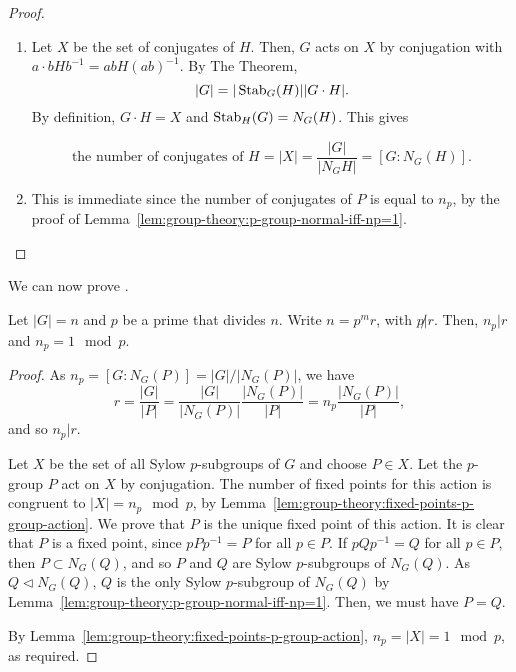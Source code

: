 \begin{proof}
  \begin{enumerate}
  \item Let \(X\) be the set of conjugates of \(H\). Then, \(G\) acts on \(X\) by conjugation with \(a \cdot bHb^{-1} = abH(ab)^{-1}\). By The  Theorem,
    \[|G| = |\operatorname{Stab}_{G}(H)| |G\cdot H|.\]
    By definition, \(G \cdot H = X\) and \(\operatorname{Stab}_{H}(G) = N_{G}(H)\). This gives

    \[\text{the number of conjugates of } H = |X| = \frac{|G|}{|N_{G}H|} = [G : N_{G}(H)].\]

  \item This is immediate since the number of conjugates of \(P\) is equal to \(n_{p}\), by the proof of Lemma~\ref{lem:group-theory:p-group-normal-iff-np=1}.
  \end{enumerate}
\end{proof}

We can now prove .

\begin{theorem}[Sylow 3]\label{thm:group-theory:Sylow-3}
  Let \(|G| = n\) and \(p\) be a prime that divides \(n\). Write \(n = p^{m}r\), with \(p \not| r\). Then, \(n_{p} | r\) and \(n_{p} = 1 \mod p\).
\end{theorem}

\begin{proof}
  As \(n_{p} = [G : N_{G}(P)] = |G|/|N_{G}(P)|\), we have
  \[r = \frac{|G|}{|P|} = \frac{|G|}{|N_{G}(P)|} \frac{|N_{G}(P)|}{|P|} = n_{p}\frac{|N_{G}(P)|}{|P|},\]
  and so \(n_{p} | r\).

  Let \(X\) be the set of all Sylow \(p\)-subgroups of \(G\) and choose \(P \in X\). Let the \(p\)-group \(P\) act on \(X\) by conjugation. The number of fixed points for this action is congruent to \(|X| = n_{p} \mod p\), by Lemma~\ref{lem:group-theory:fixed-points-p-group-action}. We prove that \(P\) is the unique fixed point of this action.
  It is clear that \(P\) is a fixed point, since \(pPp^{-1} = P\) for all \(p \in P\). If \(pQp^{-1} = Q\) for all \(p \in P\), then \(P \subset N_{G}(Q)\), and so \(P\) and \(Q\) are Sylow \(p\)-subgroups of \(N_{G}(Q)\). As \(Q \triangleleft N_{G}(Q)\), \(Q\) is the only Sylow \(p\)-subgroup of \(N_{G}(Q)\) by Lemma~\ref{lem:group-theory:p-group-normal-iff-np=1}. Then, we must have \(P = Q\).

  By Lemma~\ref{lem:group-theory:fixed-points-p-group-action}, \(n_{p} = |X| = 1 \mod p\), as required.
\end{proof}


